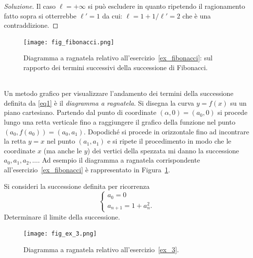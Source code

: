 \begin{proof}[Soluzione]
    Il caso $\ell=+\infty$ si può escludere in quanto ripetendo il
    ragionamento fatto sopra si otterrebbe $\ell' = 1$ da cui:
    $\ell = 1 + 1/\ell' = 2$ che è una contraddizione.
\end{proof}
\newsavebox{\qrexfibonacci}
%
\begin{figure}
  \begin{center}
    \texttt{[image: fig\_fibonacci.png]}
  \end{center}
  \caption{Diagramma a ragnatela relativo
    all'esercizio~\ref{ex_fibonacci}:
    sul rapporto dei termini successivi della successione di Fibonacci.\\\\
    \usebox{\qrexfibonacci}%
    }
  \label{fig_fibonacci}
\end{figure}

Un metodo grafico per visualizzare l'andamento dei termini della
successione definita da \eqref{eq1} è il \emph{diagramma a
  ragnatela}. Si disegna la curva $y=f(x)$ su un piano
cartesiano. Partendo dal punto di coordinate $(\alpha, 0)=(a_0, 0)$ si procede
lungo una retta verticale fino a raggiungere il grafico della funzione
nel punto $(a_0, f(a_0)) = (a_0, a_1)$.
Dopodiché si procede in
orizzontale fino ad incontrare la retta $y=x$ nel punto $(a_1,a_1)$ e
si ripete il procedimento in modo che le coordinate $x$ (ma anche le $y$)
dei vertici della spezzata mi danno la successione $a_0, a_1, a_2,
\dots$. Ad esempio il diagramma a ragnatela corrispondente
all'esercizio~\ref{ex_fibonacci} è rappresentato in
Figura~\ref{fig_fibonacci}.

\begin{exercise}\label{ex_3}
  Si consideri la successione definita per ricorrenza
  \[
  \begin{cases}
    a_0 = 0\\
    a_{n+1} = 1 + a_n^2.
  \end{cases}
  \]
  Determinare il limite della successione.
\end{exercise}
\newsavebox{\qrextre}
\begin{figure}
  \begin{center}
    \texttt{[image: fig\_ex\_3.png]}
  \end{center}
  \caption{Diagramma a ragnatela relativo
    all'esercizio~\ref{ex_3}.\\\\
    \usebox{\qrextre}}
  \label{fig_ex_3}
\end{figure}

